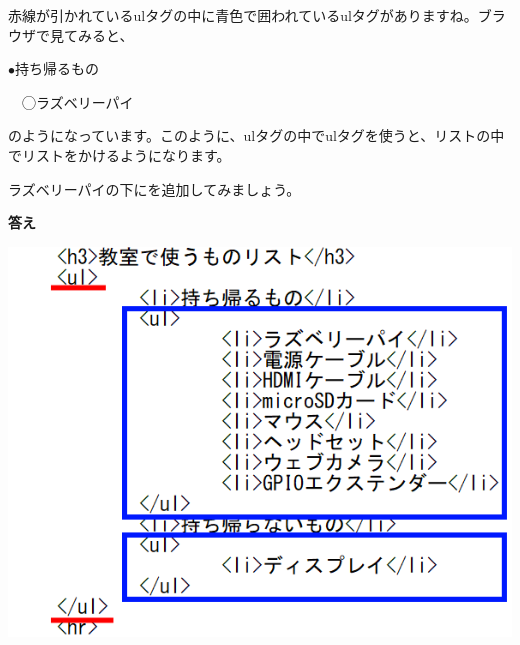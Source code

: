 赤線が引かれているulタグの中に青色で囲われているulタグがありますね。ブラウザで見てみると、

${\bullet}持ち帰るもの$

\ \ ◯ラズベリーパイ

のようになっています。このように、ulタグの中でulタグを使うと、リストの中でリストをかけるようになります。

ラズベリーパイの下にを追加してみましょう。


\bigskip


\clearpage

\flushleft
\textbf{答え}


\bigskip

\centering
\begin{minipage}{0.45\linewidth}
  \includegraphics[width=\linewidth]{text01-img/textbook-img1043.png}
\end{minipage}
\hfill
\vspace{20pt}
